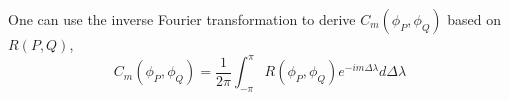 				
One can use the inverse Fourier transformation to derive $C_m(\phi_P, \phi_Q)$ based on $R(P,Q)$, 				
		\[
			C_m(\phi_P, \phi_Q) = \frac{1}{2\pi}\int_{-\pi}^{\pi} R(\phi_P, \phi_Q)e^{-im\Delta\lambda} d\Delta\lambda 
        \]
				
				
					
